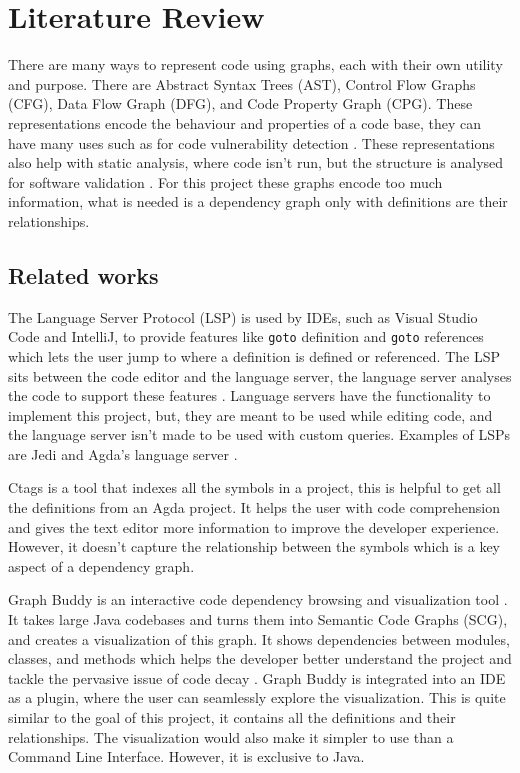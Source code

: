 
\chapter{Literature Review}


There are many ways to represent code using graphs, each with their own utility
and purpose. There are Abstract Syntax Trees (AST), Control Flow Graphs (CFG),
Data Flow Graph (DFG), and Code Property Graph (CPG). These representations
encode the behaviour and properties of a code base, they can have many uses
such as for code vulnerability detection \cite{graph_for_code_vuln}. These
representations also help with static analysis, where code isn't run, but the
structure is analysed for software validation \cite{static_analysis}. For this
project these graphs encode too much information, what is needed is a
dependency graph only with definitions are their relationships.


\section{Related works}

The Language Server Protocol (LSP) is used by IDEs, such as Visual Studio Code
and IntelliJ, to provide features like \texttt{goto} definition and
\texttt{goto} references which lets the user jump to where a definition is
defined or referenced. The LSP sits between the code editor and the language
server, the language server analyses the code to support these features
\cite{LSP_implementation}. Language servers have the functionality to implement
this project, but, they are meant to be used while editing code, and the
language server isn't made to be used with custom queries. Examples of LSPs are
Jedi \cite{jedi_lsp} and Agda's language server \cite{agda_lsp}.

Ctags \cite{ctags} is a tool that indexes all the symbols in a project, this is
helpful to get all the definitions from an Agda project. It helps the user with
code comprehension and gives the text editor more information to improve the
developer experience. However, it doesn't capture the relationship between the
symbols which is a key aspect of a dependency graph.

Graph Buddy is an interactive code dependency browsing and visualization tool
\cite{graph_buddy}. It takes large Java codebases and turns them into Semantic
Code Graphs (SCG), and creates a visualization of this graph. It shows
dependencies between modules, classes, and methods which helps the developer
better understand the project and tackle the pervasive issue of code decay
\cite{code_decay_evidence}. Graph Buddy is integrated into an IDE as a plugin,
where the user can seamlessly explore the visualization. This is quite similar
to the goal of this project, it contains all the definitions and their
relationships. The visualization would also make it simpler to use than a
Command Line Interface. However, it is exclusive to Java.

